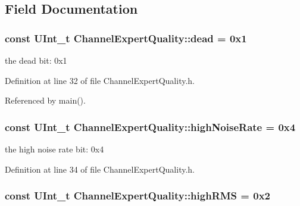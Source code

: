 \subsection{Field Documentation}
\hypertarget{class_channel_expert_quality_aabde82530d3975d698fbff3e33d7972c}{
\subsubsection[{dead}]{\setlength{\rightskip}{0pt plus 5cm}const U\-Int\-\_\-t Channel\-Expert\-Quality\-::dead = 0x1\hspace{0.3cm}{\ttfamily [static]}}}\label{class_channel_expert_quality_aabde82530d3975d698fbff3e33d7972c}


the dead bit\-: 0x1 



Definition at line 32 of file Channel\-Expert\-Quality.\-h.



Referenced by main().

\hypertarget{class_channel_expert_quality_a7ec5758ee03b6f11af837adad6b4a676}{
\subsubsection[{high\-Noise\-Rate}]{\setlength{\rightskip}{0pt plus 5cm}const U\-Int\-\_\-t Channel\-Expert\-Quality\-::high\-Noise\-Rate = 0x4\hspace{0.3cm}{\ttfamily [static]}}}\label{class_channel_expert_quality_a7ec5758ee03b6f11af837adad6b4a676}


the high noise rate bit\-: 0x4 



Definition at line 34 of file Channel\-Expert\-Quality.\-h.

\hypertarget{class_channel_expert_quality_a0b17164b19cdc8619c1a93fe1728c4c3}{
\subsubsection[{high\-R\-M\-S}]{\setlength{\rightskip}{0pt plus 5cm}const U\-Int\-\_\-t Channel\-Expert\-Quality\-::high\-R\-M\-S = 0x2\hspace{0.3cm}{\ttfamily [static]}}}\label{class_channel_expert_quality_a0b17164b19cdc8619c1a93fe1728c4c3}


